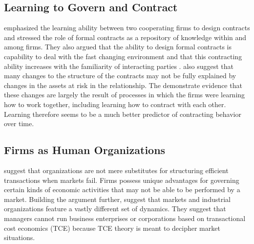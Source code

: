 \documentclass[12pt,letterpaper]{article}
\begin{document}
\subsection{Learning to Govern and Contract}
\cite{Mayer2004} emphasized the learning ability between two cooperating firms to design contracts and stressed the role of formal contracts as a repository of knowledge within and among firms. They also argued that the ability to design formal contracts is capability to deal with the fast changing environment and that this contracting ability increases with the familiarity of interacting parties \cite{Mayer2004}. \cite{Mayer2004} also suggest that many changes to the structure of the contracts may not be fully explained by changes in the assets at risk in the relationship. The demonstrate evidence that these changes are largely the result of processes in which the firms were learning how to work together, including learning how to contract with each other. Learning therefore seems to be a much better predictor of contracting behavior over time.
 

\subsection{Firms as Human Organizations}
\cite{Ghoshal1996} suggest that organizations are not mere substitutes for structuring efficient transactions when markets fail. Firms possess unique advantages for governing certain kinds of economic activities that may not be able to be performed by a market. Building the argument further, \cite{Moran1996} suggest that markets and industrial organizations feature a vastly different set of dynamics. They suggest that managers cannot run business enterprises or corporations based on transactional cost economics (TCE) because TCE theory is meant to decipher market situations.
\end{document}
